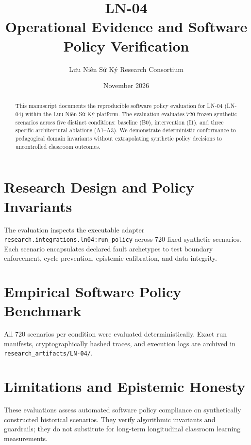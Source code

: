 \documentclass[11pt,a4paper]{article}
\title{LN-04 \\ \large Operational Evidence and Software Policy Verification}
\author{Lưu Niên Sứ Ký Research Consortium}
\date{November 2026}
\begin{document}
\maketitle

\begin{abstract}
This manuscript documents the reproducible software policy evaluation for LN-04 (LN-04) within the Lưu Niên Sứ Ký platform. The evaluation evaluates 720 frozen synthetic scenarios across five distinct conditions: baseline (B0), intervention (I1), and three specific architectural ablations (A1--A3). We demonstrate deterministic conformance to pedagogical domain invariants without extrapolating synthetic policy decisions to uncontrolled classroom outcomes.
\end{abstract}

\section{Research Design and Policy Invariants}
The evaluation inspects the executable adapter \texttt{research.integrations.ln04:run_policy} across 720 fixed synthetic scenarios. Each scenario encapsulates declared fault archetypes to test boundary enforcement, cycle prevention, epistemic calibration, and data integrity.

\section{Empirical Software Policy Benchmark}


All 720 scenarios per condition were evaluated deterministically. Exact run manifests, cryptographically hashed traces, and execution logs are archived in \texttt{research\_artifacts/LN-04/}.

\section{Limitations and Epistemic Honesty}
These evaluations assess automated software policy compliance on synthetically constructed historical scenarios. They verify algorithmic invariants and guardrails; they do not substitute for long-term longitudinal classroom learning measurements.
\end{document}
